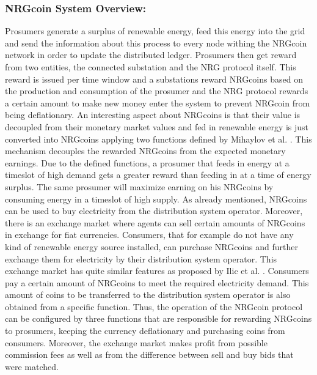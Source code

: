 \documentclass[runningheads]{llncs}
\begin{document}
\subsubsection{NRGcoin System Overview:} Prosumers generate a surplus of renewable energy, feed this energy into the grid and send the information about this process to every node withing the NRGcoin network in order to update the distributed ledger. Prosumers then get reward from two entities, the connected substation and the NRG protocol itself. This reward is issued per time window and a substations reward NRGcoins based on the production and consumption of the prosumer and the NRG protocol rewards a certain amount to make new money enter the system to prevent NRGcoin from being deflationary. \newline
An interesting aspect about NRGcoins is that their value is decoupled from their monetary market values and fed in renewable energy is just converted into NRGcoins applying two functions defined by Mihaylov et al. \cite{mihaylov_nrgcoin}. This mechanism decouples the rewarded NRGcoins from the expected monetary earnings. Due to the defined functions, a prosumer that feeds in energy at a timeslot of high demand gets a greater reward than feeding in at a time of energy surplus. The same prosumer will maximize earning on his NRGcoins by consuming energy in a timeslot of high supply.
As already mentioned, NRGcoins can be used to buy electricity from the distribution system operator. Moreover, there is an exchange market where agents can sell certain amounts of NRGcoins in exchange for fiat currencies. Consumers, that for example do not have any kind of renewable energy source installed, can purchase NRGcoins and further exchange them for electricity by their distribution system operator. This exchange market has quite similar features as proposed by Ilic et al. \cite{ilic_smart_grid_neighbourhoods}.
Consumers pay a certain amount of NRGcoins to meet the required electricity demand. This amount of coins to be transferred to the distribution system operator is also obtained from a specific function. Thus, the operation of the NRGcoin protocol can be configured by three functions that are responsible for rewarding NRGcoins to prosumers, keeping the currency deflationary and purchasing coins from consumers. \cite{mihaylov_nrgcoin}
Moreover, the exchange market makes profit from possible commission fees as well as from the difference between sell and buy bids that were matched.
\end{document}
